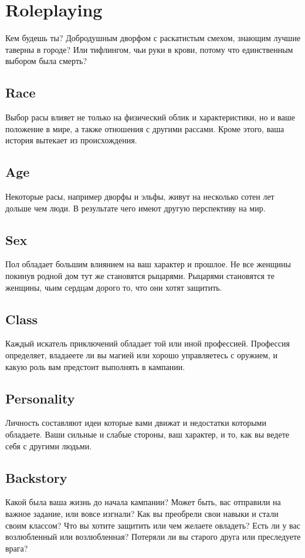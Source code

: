 \documentclass[a5paper,11pt]{book}
\begin{document}
\chapter{Roleplaying}
\begin{multicols}{2}
\lettrine{К}{}ем будешь ты? Добродушным дворфом с раскатистым смехом, знающим лучшие таверны в городе? Или тифлингом, чьи руки в крови, потому что единственным выбором была смерть?

\section{Race}
Выбор расы влияет не только на физический облик и характеристики, но и ваше положение в мире, а также отношения с другими рассами. Кроме этого, ваша история вытекает из происхождения.

\section{Age}
Некоторые расы, например дворфы и эльфы, живут на несколько сотен лет дольше чем люди. В результате чего имеют другую перспективу на мир.

\section{Sex}
Пол обладает большим влиянием на ваш характер и прошлое. Не все женщины покинув родной дом тут же становятся рыцарями. Рыцарями становятся те женщины, чьим сердцам дорого то, что они хотят защитить.

\section{Class}
Каждый искатель приключений обладает той или иной профессией. Профессия определяет, владаеете ли вы магией или хорошо управляетесь с оружием, и какую роль вам предстоит выполнять в кампании.

\section{Personality}
Личность составляют идеи которые вами движат и недостатки которыми обладаете. Ваши сильные и слабые стороны, ваш характер, и то, как вы ведете себя с другими людьми.

\section{Backstory}
Какой была ваша жизнь до начала кампании? Может быть, вас отправили на важное задание, или вовсе изгнали? Как вы преобрели свои навыки и стали своим классом? Что вы хотите защитить или чем желаете овладеть? Есть ли у вас возлюбленный или возлюбленная? Потеряли ли вы старого друга или преследуете врага?


\end{multicols}
\end{document}
